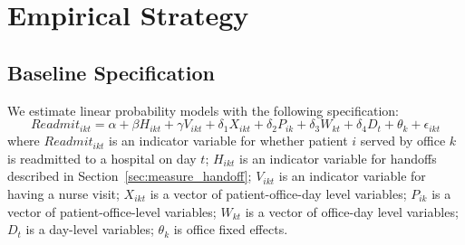 \documentclass[final,12pt, notitlepage]{article}
\begin{document}
%
%

\section{Empirical Strategy} \label{sec:empr_strategy}

\subsection{Baseline Specification} \label{sec:spec}

We estimate linear probability models with the following specification:
\begin{equation}\label{eq:regeq}
Readmit_{ikt} = \alpha + \beta H_{ikt} + \gamma V_{ikt} + \delta_1 X_{ikt} + \delta_2 P_{ik} + \delta_3 W_{kt} + \delta_4 D_t + \theta_k + \epsilon_{ikt}
\end{equation}
where $Readmit_{ikt}$ is an indicator variable for whether patient $i$ served by office $k$ is readmitted to a hospital on day $t$;
$H_{ikt}$ is an indicator variable for handoffs described in Section~\ref{sec:measure_handoff};
$V_{ikt}$ is an indicator variable for having a nurse visit;
$X_{ikt}$ is a vector of patient-office-day level variables;
$P_{ik}$ is a vector of patient-office-level variables;
$W_{kt}$ is a vector of office-day level variables;
$D_t$ is a day-level variables;
$\theta_k$ is office fixed effects.
\end{document}
